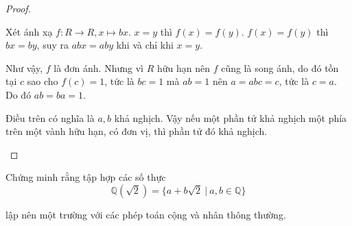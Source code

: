 \begin{proof}
\begin{enumerate}[label = (\alph*)]
              Xét ánh xạ $f: R\rightarrow R, x\mapsto bx$. $x = y$ thì $f(x) = f(y)$. $f(x) = f(y)$ thì $bx = by$, suy ra $abx = aby$ khi và chỉ khi $x = y$.
              
              Như vậy, $f$ là đơn ánh. Nhưng vì $R$ hữu hạn nên $f$ cũng là song ánh, do đó tồn tại $c$ sao cho $f(c) = 1$, tức là $bc = 1$ mà $ab = 1$ nên $a = abc = c$, tức là $c = a$. Do đó $ab = ba = 1$.
              
              Điều trên có nghĩa là $a, b$ khả nghịch. Vậy nếu một phần tử khả nghịch một phía trên một vành hữu hạn, có đơn vị, thì phần tử đó khả nghịch.
    \end{enumerate}
\end{proof}

\begin{exercise}Chứng minh rằng tập hợp các số thực
    \[ \mathbb{Q}(\sqrt{2}) = \{ a + b\sqrt{2}\ |\ a, b\in\mathbb{Q} \} \]
    \par lập nên một trường với các phép toán cộng và nhân thông thường.
\end{exercise}

